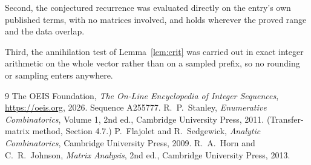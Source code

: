 \documentclass[11pt,a4paper]{article}
\theoremstyle{plain}
\theoremstyle{definition}
\begin{document}
Second, the conjectured recurrence was evaluated directly on the entry's own published terms,
with no matrices involved, and holds wherever the proved range and the data overlap.

Third, the annihilation test of Lemma~\ref{lem:crit} was carried out in exact integer
arithmetic on the whole vector rather than on a sampled prefix, so no rounding or sampling
enters anywhere.

\begin{thebibliography}{9}
 The OEIS Foundation, \emph{The On-Line Encyclopedia of Integer
Sequences}, \url{https://oeis.org}, 2026. Sequence A255777.
 R.~P.~Stanley, \emph{Enumerative Combinatorics}, Volume 1, 2nd ed.,
Cambridge University Press, 2011. (Transfer-matrix method, Section 4.7.)
 P.~Flajolet and R.~Sedgewick, \emph{Analytic Combinatorics}, Cambridge
University Press, 2009.
 R.~A.~Horn and C.~R.~Johnson, \emph{Matrix Analysis}, 2nd ed., Cambridge
University Press, 2013.
\end{thebibliography}
\end{document}
